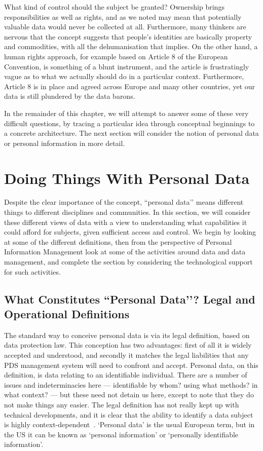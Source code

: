 \documentclass[graybox]{svmult}
\begin{document}
What kind of control should the subject be granted? Ownership brings responsibilities as well as rights, and as we noted may mean that potentially valuable data would never be collected at all. Furthermore, many thinkers are nervous that the concept suggests that people's identities are basically property and commodities, with all the dehumanisation that implies. On the other hand, a human rights approach, for example based on Article 8 of the European Convention, is something of a blunt instrument, and the article is frustratingly vague as to what we actually should do in a particular context. Furthermore, Article 8 is in place and agreed across Europe and many other countries, yet our data is still plundered by the data barons.

In the remainder of this chapter, we will attempt to answer some of these very difficult questions, by tracing a particular idea through conceptual beginnings to a concrete architecture. The next section will consider the notion of personal data or personal information in more detail.

\section{Doing Things With Personal Data}

Despite the clear importance of the concept, ``personal data’’ means different things to different disciplines and communities. In this section, we will consider these different views of data with a view to understanding what capabilities it could afford for subjects, given sufficient access and control. We begin by looking at some of the different definitions, then from the perspective of Personal Information Management look at some of the activities around data and data management, and complete the section by considering the technological support for such activities.

\subsection{What Constitutes ``Personal Data’’? Legal and Operational Definitions}

The standard way to conceive personal data is via its legal definition, based on data protection law. This conception has two advantages: first of all it is widely accepted and understood, and secondly it matches the legal liabilities that any PDS management system will need to confront and accept. Personal data, on this definition, is data relating to an identifiable individual. There are a number of issues and indeterminacies here --- identifiable by whom? using what methods? in what context? --- but these need not detain us here, except to note that they do not make things any easier. The legal definition has not really kept up with technical developments, and it is clear that the ability to identify a data subject is highly context-dependent~\cite{narayanan2010}. `Personal data’ is the usual European term, but in the US it can be known as `personal information’ or ‘personally identifiable information’.
\end{document}
